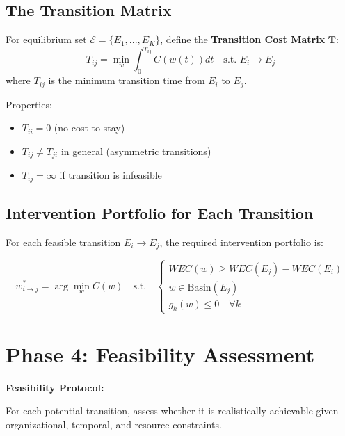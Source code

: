 \subsection{The Transition Matrix}

\begin{definition}
For equilibrium set $\mathcal{E} = \{E_1, ..., E_K\}$, define the
\textbf{Transition Cost Matrix} $\mathbf{T}$:
\begin{equation}
T_{ij} = \min_{w} \int_0^{T_{ij}} C(w(t)) dt \quad \text{s.t. } E_i \to E_j
\end{equation}
where $T_{ij}$ is the minimum transition time from $E_i$ to $E_j$.

Properties:
\begin{itemize}[nosep]
    \item $T_{ii} = 0$ (no cost to stay)
    \item $T_{ij} \neq T_{ji}$ in general (asymmetric transitions)
    \item $T_{ij} = \infty$ if transition is infeasible
\end{itemize}
\end{definition}

\subsection{Intervention Portfolio for Each Transition}

For each feasible transition $E_i \to E_j$, the required intervention portfolio is:

\begin{equation}
w^*_{i \to j} = \arg\min_{w} C(w) \quad \text{s.t.} \quad
\begin{cases}
WEC(w) \geq WEC(E_j) - WEC(E_i) \\
w \in \text{Basin}(E_j) \\
g_k(w) \leq 0 \quad \forall k
\end{cases}
\end{equation}

\section{Phase 4: Feasibility Assessment}
\label{sec:meq-feasibility}

\begin{tcolorbox}[colback=green!5!white, colframe=green!75!black,
    title=Question 4: Is It Realistic?]

\textbf{Feasibility Protocol:}

For each potential transition, assess whether it is realistically achievable
given organizational, temporal, and resource constraints.

\end{tcolorbox}

